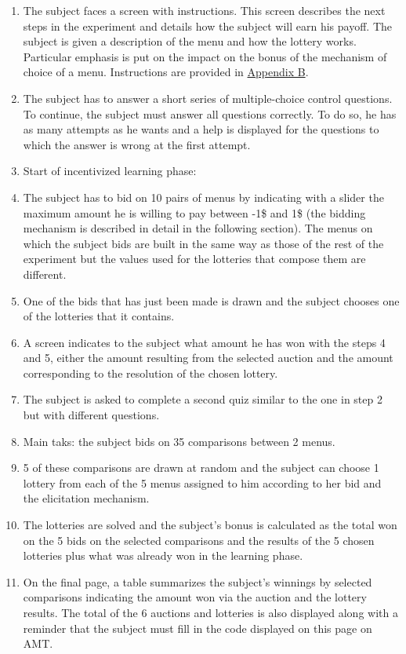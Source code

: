 \documentclass[
]{book}
\providecommand{\tightlist}{%
  \setlength{\itemsep}{0pt}\setlength{\parskip}{0pt}}
\begin{document}
\begin{enumerate}
\def\labelenumi{\arabic{enumi}.}
\tightlist
\item
  The subject faces a screen with instructions.
  This screen describes the next steps in the experiment and details how the
  subject will earn his payoff.
  The subject is given a description of the menu and how the lottery works.
  Particular emphasis is put on the impact on the bonus of the mechanism of choice
  of a menu.
  Instructions are provided in \protect\hyperlink{expe-instruc3}{Appendix B}.
\item
  The subject has to answer a short series of multiple-choice control questions.
  To continue, the subject must answer all questions correctly.
  To do so, he has as many attempts as he wants and a help is displayed for the
  questions to which the answer is wrong at the first attempt.
\item
  Start of incentivized learning phase:
\item
  The subject has to bid on 10 pairs of menus by indicating with a slider the
  maximum amount he is willing to pay between -1\$ and 1\$ (the bidding mechanism
  is described in detail in the following section).
  The menus on which the subject bids are built in the same way as those of the
  rest of the experiment but the values used for the lotteries that compose them
  are different.
\item
  One of the bids that has just been made is drawn and the subject chooses one
  of the lotteries that it contains.
\item
  A screen indicates to the subject what amount he has won with the steps 4 and
  5, either the amount resulting from the selected auction and the amount
  corresponding to the resolution of the chosen lottery.
\item
  The subject is asked to complete a second quiz similar to the one in step 2
  but with different questions.
\item
  Main taks: the subject bids on 35 comparisons between 2 menus.
\item
  5 of these comparisons are drawn at random and the subject can choose 1
  lottery from each of the 5 menus assigned to him according to her bid and the elicitation mechanism.
\item
  The lotteries are solved and the subject's bonus is calculated as the total
  won on the 5 bids on the selected comparisons and the results of the 5 chosen
  lotteries plus what was already won in the learning phase.
\item
  On the final page, a table summarizes the subject's winnings by selected
  comparisons indicating the amount won via the auction and the lottery results.
  The total of the 6 auctions and lotteries is also displayed along with a
  reminder that the subject must fill in the code displayed on this page on AMT.
\end{enumerate}
\end{document}
